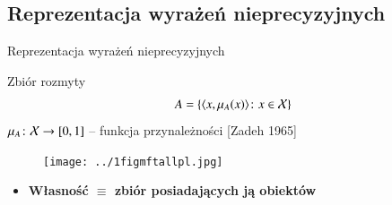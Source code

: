 \documentclass{beamer}
\begin{document}
\subsection{Reprezentacja wyrażeń nieprecyzyjnych}
\begin{frame}{Reprezentacja wyrażeń nieprecyzyjnych} %

\begin{block}{Zbiór rozmyty}
\begin{equation}\label{formfs}
A = \{\langle x, \mu_A(x)\rangle\colon x \in {\cal X}\}
\end{equation}
$\mu_A\colon{\cal X}\to[0,1]$ -- funkcja przynależności [Zadeh 1965]
\end{block}

\begin{figure}
\centering
\texttt{[image: ../1figmftallpl.jpg]}
\end{figure}

\begin{itemize}
\item <2-> \textbf{Własność $\equiv$ zbiór posiadających ją obiektów}
\end{itemize}

\end{frame}
\end{document}
